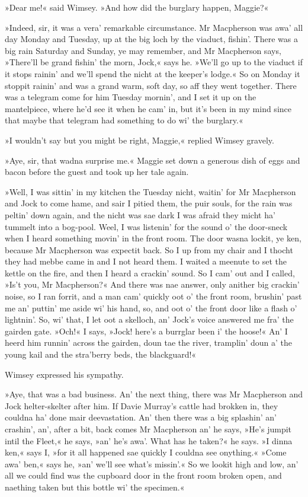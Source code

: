 »Dear me!« said Wimsey. »And how did the burglary happen, Maggie?«

»Indeed, sir, it was a vera' remarkable circumstance. Mr Macpherson was awa' all day Monday and Tuesday, up at the big loch by the viaduct, fishin'. There was a big rain Saturday and Sunday, ye may remember, and Mr Macpherson says, »There'll be grand fishin' the morn, Jock,« says he. »We'll go up to the viaduct if it stops rainin' and we'll spend the nicht at the keeper's lodge.« So on Monday it stoppit rainin' and was a grand warm, soft day, so aff they went together. There was a telegram come for him Tuesday mornin', and I set it up on the mantelpiece, where he'd see it when he cam' in, but it's been in my mind since that maybe that telegram had something to do wi' the burglary.«

»I wouldn't say but you might be right, Maggie,« replied Wimsey gravely.

»Aye, sir, that wadna surprise me.« Maggie set down a generous dish of eggs and bacon before the guest and took up her tale again.

»Well, I was sittin' in my kitchen the Tuesday nicht, waitin' for Mr Macpherson and Jock to come hame, and sair I pitied them, the puir souls, for the rain was peltin' down again, and the nicht was sae dark I was afraid they micht ha' tummelt into a bog-pool. Weel, I was listenin' for the sound o' the door-sneck when I heard something movin' in the front room. The door wasna lockit, ye ken, because Mr Macpherson was expectit back. So I up from my chair and I thocht they had mebbe came in and I not heard them. I waited a meenute to set the kettle on the fire, and then I heard a crackin' sound. So I cam' out and I called, »Is't you, Mr Macpherson?« And there was nae answer, only anither big crackin' noise, so I ran forrit, and a man cam' quickly oot o' the front room, brushin' past me an' puttin' me aside wi' his hand, so, and oot o' the front door like a flash o' lightnin'. So, wi' that, I let oot a skelloch, an' Jock's voice answered me fra' the gairden gate. »Och!« I says, »Jock! here's a burrglar been i' the hoose!« An' I heerd him runnin' across the gairden, doun tae the river, tramplin' doun a' the young kail and the stra'berry beds, the blackguard!«

Wimsey expressed his sympathy.

»Aye, that was a bad business. An' the next thing, there was Mr Macpherson and Jock helter-skelter after him. If Davie Murray's cattle had brokken in, they couldna ha' done mair deevastation. An' then there was a big splashin' an' crashin', an', after a bit, back comes Mr Macpherson an' he says, »He's jumpit intil the Fleet,« he says, »an' he's awa'. What has he taken?« he says. »I dinna ken,« says I, »for it all happened sae quickly I couldna see onything.« »Come awa' ben,« says he, »an' we'll see what's missin'.« So we lookit high and low, an' all we could find was the cupboard door in the front room broken open, and naething taken but this bottle wi' the specimen.«

